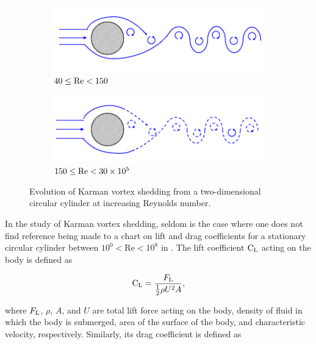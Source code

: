 \documentclass[oneside]{utmthesis}
\begin{document}
\begin{figure}[!h]
  \begin{subfigure}[h]{0.45\textwidth}
    \includegraphics[width=\textwidth]{figs/karmanVortex40-150}
    \caption{$40 \leq \text{Re} < 150$}
    \label{fig:kv40150}
  \end{subfigure}
  \hspace{1cm}
  \begin{subfigure}[h]{0.45\textwidth}
    \includegraphics[width=\textwidth]{figs/karmanVortex150-30k}
    \caption{$150 \leq \text{Re} < 30 \times 10^{5}$}
    \label{fig:kv15030k}
  \end{subfigure}
  \caption{Evolution of Karman vortex shedding from a two-dimensional circular cylinder at increasing Reynolds number.} \label{fig:karmanVortexEvolution}
\end{figure}

In the study of Karman vortex shedding, seldom is the case where one does not find reference being made to a chart on lift and drag coefficients for a stationary circular cylinder between $10^{0} < \text{Re} < 10^{8}$ in \citet{Zdravkovich1997}. The lift coefficient $\text{C}_{\text{L}}$ acting on the body is defined as

\begin{equation}
  \text{C}_{\text{L}} = \frac{F_{\text{L}}}{\frac{1}{2}\rho U^{2} A},
  \label{eq:clDef}
\end{equation}

\noindent where $F_{\text{L}}$, $\rho$, $A$, and $U$ are total lift force acting on the body, density of fluid in which the body is submerged, area of the surface of the body, and characteristic velocity, respectively. Similarly, its drag coefficient is defined as
\end{document}
